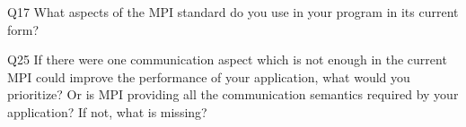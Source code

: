 \begin{description}%
\item{Q17} What aspects of the MPI standard do you use in your program in its current form?%
\item{Q25} If there were one communication aspect which is not enough in the current MPI could improve the performance of your application, what would you prioritize? Or is MPI providing all the communication semantics required by your application? If not, what is missing?%
\end{description}%
